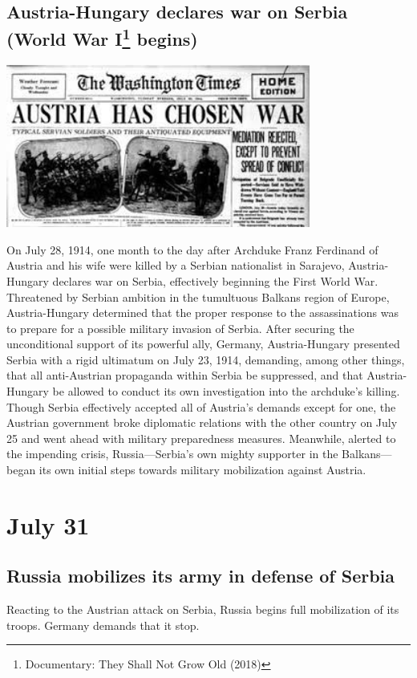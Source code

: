 \documentclass[11pt]{report}
\begin{document}
\subsection{Austria-Hungary declares war on Serbia (World War I\protect\footnote{Documentary: They Shall Not Grow Old (2018)} begins)}
\vspace{2mm}\begin{center}\includegraphics[width=10cm]{./img/austriaWarSerbia.jpg}\end{center}
On July 28, 1914, one month to the day after Archduke Franz Ferdinand of Austria and his wife were killed by a Serbian nationalist in Sarajevo, Austria-Hungary declares war on Serbia, effectively beginning the First World War.\\

Threatened by Serbian ambition in the tumultuous Balkans region of Europe, Austria-Hungary determined that the proper response to the assassinations was to prepare for a possible military invasion of Serbia. After securing the unconditional support of its powerful ally, Germany, Austria-Hungary presented Serbia with a rigid ultimatum on July 23, 1914, demanding, among other things, that all anti-Austrian propaganda within Serbia be suppressed, and that Austria-Hungary be allowed to conduct its own investigation into the archduke’s killing. Though Serbia effectively accepted all of Austria’s demands except for one, the Austrian government broke diplomatic relations with the other country on July 25 and went ahead with military preparedness measures. Meanwhile, alerted to the impending crisis, Russia—Serbia’s own mighty supporter in the Balkans—began its own initial steps towards military mobilization against Austria.


\section{July 31}
\subsection{Russia mobilizes its army in defense of Serbia}
Reacting to the Austrian attack on Serbia, Russia begins full mobilization of its troops. Germany demands that it stop.
\end{document}
